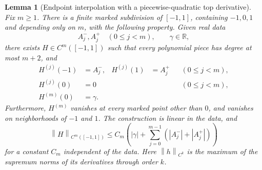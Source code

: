 \documentclass[11pt,reqno]{amsart}
\numberwithin{equation}{section}
\newtheorem{lemma}[theorem]{Lemma}
\theoremstyle{definition}
\theoremstyle{remark}
\newcommand{\R}{\mathbb R}
\newcommand{\norm}[1]{\left\lVert #1\right\rVert}
\begin{document}
\begin{lemma}[Endpoint interpolation with a piecewise-quadratic top derivative]\label{ho:lem:finite}
Fix $m\ge1$. There is a finite marked subdivision of $[-1,1]$, containing $-1,0,1$ and depending only on $m$, with the following property. Given real data
\[
 A_j^-,A_j^+\quad(0\le j<m),\qquad \gamma\in\R,
\]
there exists $H\in C^m([-1,1])$ such that every polynomial piece has degree at most $m+2$, and
\begin{align*}
 H^{(j)}(-1)&=A_j^-,& H^{(j)}(1)&=A_j^+ &&(0\le j<m),\\
 H^{(j)}(0)&=0 &&&&(0\le j<m),\\
 H^{(m)}(0)&=\gamma.
\end{align*}
Furthermore, $H^{(m)}$ vanishes at every marked point other than $0$, and vanishes on neighborhoods of $-1$ and $1$. The construction is linear in the data, and
\begin{equation}\label{ho:eq:Hbound}
 \norm{H}_{C^m([-1,1])}\le C_m\left(|\gamma|+\sum_{j=0}^{m-1}(|A_j^-|+|A_j^+|)\right)
\end{equation}
for a constant $C_m$ independent of the data. Here $\norm{h}_{C^k}$ is the maximum of the supremum norms of its derivatives through order $k$.
\end{lemma}
\end{document}
